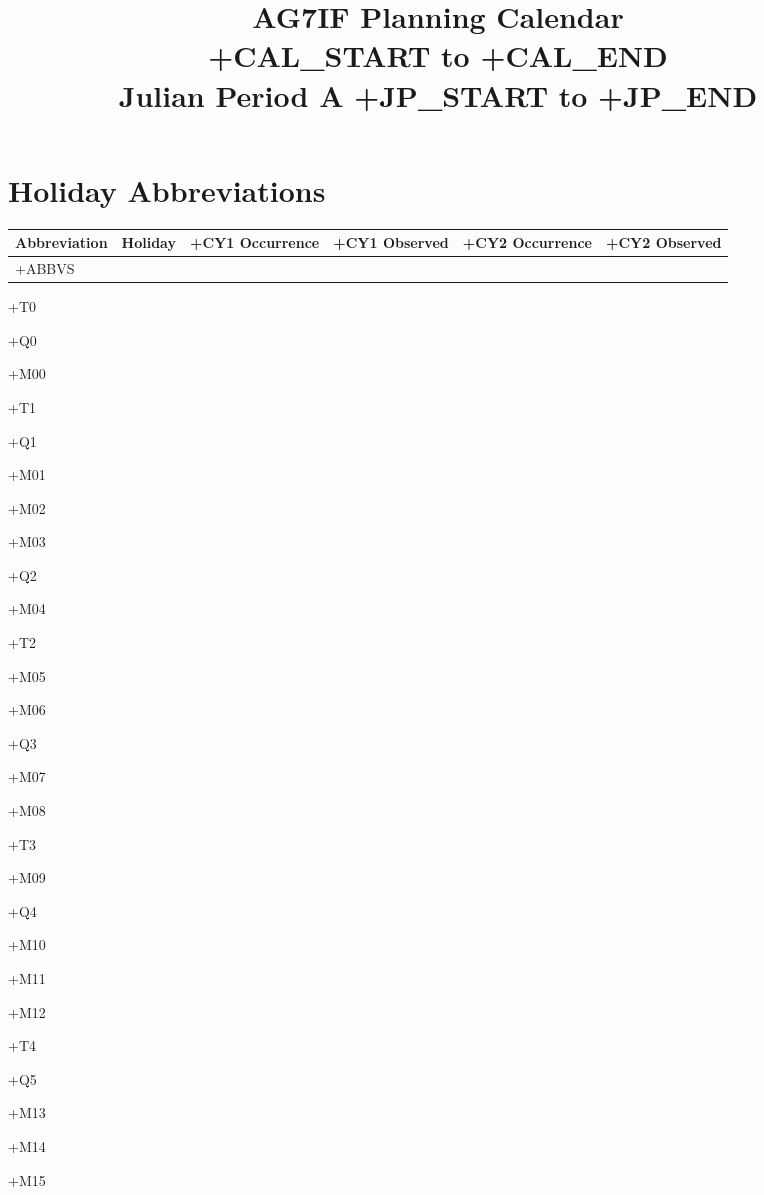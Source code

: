 \documentclass[10pt]{book}
\title{\Huge{}AG7IF Planning Calendar \\ +CAL_START to +CAL_END \\ Julian Period A +JP_START to +JP_END}
\author{}
\date{}
\begin{document}
\maketitle

\section*{Holiday Abbreviations}
\begin{tabularx}{\textwidth}{lXrrrr}
    \toprule
    Abbreviation & Holiday & +CY1 Occurrence & +CY1 Observed & +CY2 Occurrence & +CY2 Observed \\
    \midrule
    +ABBVS
    \bottomrule
\end{tabularx}

+T0

+Q0

+M00

+T1

+Q1

+M01

+M02

+M03

+Q2

+M04

+T2

+M05

+M06

+Q3

+M07

+M08

+T3

+M09

+Q4

+M10

+M11

+M12

+T4

+Q5

+M13

+M14

+M15
\end{document}
